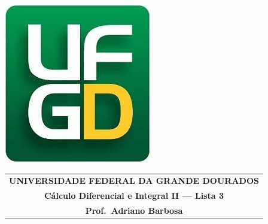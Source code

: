 \documentclass[a4paper,5pt]{amsbook}
\begin{document}
\thispagestyle{empty}
\pagestyle{empty}
\begin{minipage}[h]{0.14\textwidth}
	\includegraphics[scale=0.24]{../../ufgd.png}
\end{minipage}
\begin{minipage}[h]{\textwidth}
\begin{tabular}{c}
{{\bf UNIVERSIDADE FEDERAL DA GRANDE DOURADOS}}\\
{{\bf C\'{a}lculo Diferencial e Integral II --- Lista 3}}\\
{{\bf Prof.\ Adriano Barbosa}}\\
\end{tabular}
\vspace{-0.45cm}
%
\end{minipage}

\end{document}
